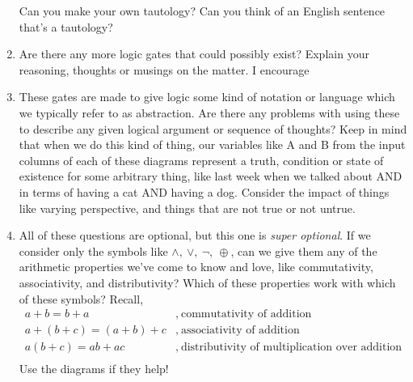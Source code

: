 \begin{enumerate}
        \vspace{10mm}
        Can you make your own tautology? Can you think of an English sentence that's a tautology?
    \item Are there any more logic gates that could possibly exist? Explain your reasoning, thoughts or musings on the matter. I encourage
    \item These gates are made to give logic some kind of notation or language which we typically refer to as abstraction. Are there any problems
        with using these to describe any given logical argument or sequence of thoughts? Keep in mind that when we do this kind of thing, our variables
        like A and B from the input columns of each of these diagrams represent a truth, condition or state of existence for some arbitrary thing, like
        last week when we talked about AND in terms of having a cat AND having a dog. Consider the impact of things like varying perspective, and things
        that are not true or not untrue.
        \newpage
    \item All of these questions are optional, but this one is \textit{super optional}. If we consider only the symbols like $\land,\ \lor,\ \neg,\ \oplus$,
        can we give them any of the arithmetic properties we've come to know and love, like commutativity, associativity, and distributivity? Which of
        these properties work with which of these symbols? Recall,
        \begin{align*}
            a+b=b+a&,\ \text{commutativity of addition}\\
            a+(b+c)=(a+b)+c&,\ \text{associativity of addition}\\
            a(b+c)=ab+ac&,\ \text{distributivity of multiplication over addition}\\
        \end{align*}
        Use the diagrams if they help!
\end{enumerate}

